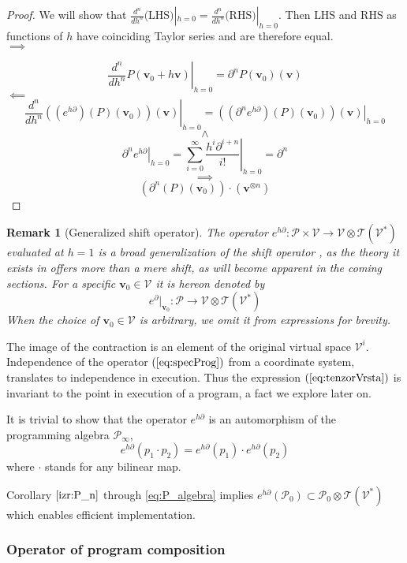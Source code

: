 \documentclass[smallcondensed]{svjour3}
\newcommand{\T}{\mathcal{T}}
\newcommand{\VV}{\mathcal{V}}
\newcommand{\vv}{\mathbf{v}}
\newcommand{\dP}{\mathcal{P}}
\newcommand{\D}{\partial}
\newtheorem{opomba}{Remark}[section]
\begin{document}
 \begin{proof}
We will show that $\frac{d^n}{dh^n}\text{(LHS)}|_{h=0}=\frac{d^n}{dh^n}\text{(RHS)}|_{h=0}$. Then $\text{LHS}$ and $\text{RHS}$ as functions
of $h$ have coinciding Taylor series and are therefore equal.\\
 $\implies$
 
 $$\left. \frac{d^n}{dh^n}P(\vv_0+h\vv)\right|_{h=0}=\D^n P(\vv_0)(\vv)$$
 $\impliedby$
 $$\left. \frac{d^n}{dh^n}\left((e^{h\D})(P)(\vv_0)\right)(\vv)\right|_{h=0}=
\left. \left((\D^n e^{h\D})(P)(\vv_0)\right)(\vv)\right|_{h=0}$$
 $$\land$$
 $$\left. \D^ne^{h\D}\right| _{h=0}=\left. \sum\limits_{i=0}^{\infty}\frac{h^i\D^{i+n}}{i!}\right|_{h=0}=\D^n$$
 $$\implies$$
 $$\left(\D^n(P)(\vv_0)\right)\cdot(\vv^{\otimes n})$$
 \end{proof}
 \begin{opomba}[Generalized shift operator]\label{rmrk:genShift}
 The operator $e^{h\D}:\dP\times \VV\to \VV\otimes \T(\VV^*)$ evaluated at $h=1$ is a broad generalization of the shift operator \cite{OpCalc}, as the theory it exists in offers more than a mere shift, as will become apparent in the coming sections.
 For a specific $\vv_0\in\VV$ it is hereon denoted by
 \begin{equation}
 e^\D\vert_{\vv_0}:\dP\to \VV\otimes \T(\VV^*)
 \end{equation}
 When the choice of $\vv_0\in\VV$ is arbitrary, we omit it from expressions for brevity.
 \end{opomba}
 
 The image of the contraction is an element of the original virtual space $\VV^i$. Independence of the operator $(\ref{eq:specProg})$ from a coordinate system, translates to independence in execution. Thus the expression $(\ref{eq:tenzorVrsta})$ is invariant to the point in execution of a program, a fact we explore later on.  
 
 It is trivial to show that the operator $e^{h\D}$ is an automorphism of the programming algebra $\dP_\infty$,
\begin{equation}\label{eq:prod}
 	e^{h\D}(p_1\cdot p_2)=e^{h\D}(p_1)\cdot e^{h\D}(p_2)
 \end{equation}
 where $\cdot$ stands for any bilinear map.
 
 Corollary $\ref{izr:P_n}$ through \eqref{eq:P_algebra} implies
      	$e^{h\D}(\dP_0)\subset\dP_0\otimes \T(\VV^*)$      
 which enables efficient implementation. 
  
 \subsubsection{Operator of program composition}\label{sec:compsition}
 
\end{document}
